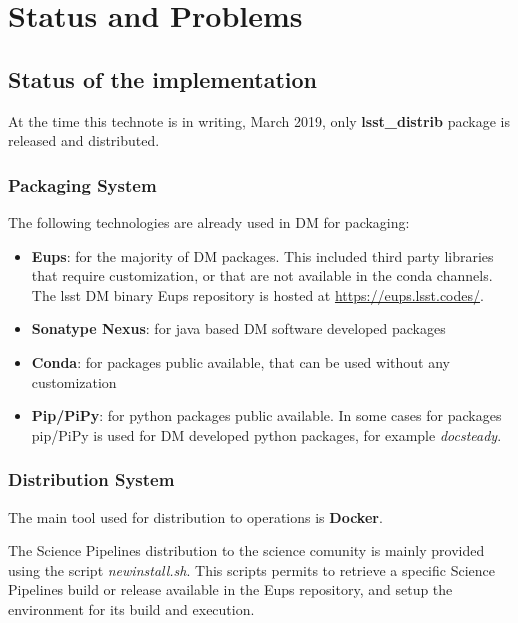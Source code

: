 \section{Status and Problems} \label{sec:statusAndProblems}

\subsection{Status of the implementation} \label{sec:status}

At the time this technote is in writing, March 2019, only \textbf{lsst\_distrib} package is released and distributed.


\subsubsection{Packaging System} \label{sec:statusPkgs}

The following technologies are already used in DM for packaging:

\begin{itemize}
\item {\bf Eups}: for the majority of DM packages. This included third party libraries that require customization, or that are not available in the conda channels. The lsst DM binary Eups repository is hosted at \url{https://eups.lsst.codes/}. 
\item {\bf Sonatype Nexus}: for java based DM software developed packages
\item {\bf Conda}: for packages public available, that can be used without any customization
\item {\bf Pip/PiPy}: for python packages public available. In some cases for packages pip/PiPy is used for DM developed python packages, for example \textit{docsteady}.
\end{itemize}


\subsubsection{Distribution System} \label{sec:statusDistrib}

The main tool used for distribution to operations is \textbf{Docker}. 

The Science Pipelines distribution to the science comunity is mainly provided using the script \textit{newinstall.sh}. 
This scripts permits to retrieve a specific Science Pipelines build or release available in the Eups repository, and setup the environment for its build and execution.

